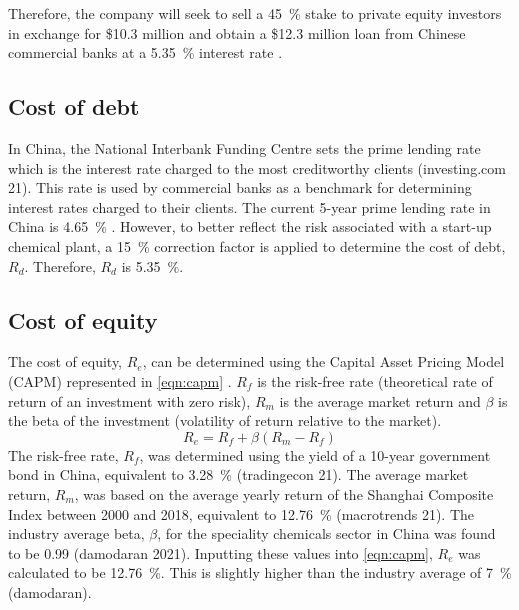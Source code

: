 Therefore, the company will seek to sell a \SI{45}{\percent} stake to private equity investors in exchange for \$10.3 million and obtain a \$12.3 million loan from Chinese commercial banks at a \SI{5.35}{\percent} interest rate \cite{rmb_industrial_21}.

\subsection{Cost of debt}
\label{sec:debt}
In China, the National Interbank Funding Centre sets the prime lending rate which is the interest rate charged to the most creditworthy clients (investing.com 21). This rate is used by commercial banks as a benchmark for determining interest rates charged to their clients. The current 5-year prime lending rate in China is \SI{4.65}{\percent} \cite{rmb_industrial_21}. However, to better reflect the risk associated with a start-up chemical plant, a \SI{15}{\percent} correction factor is applied to determine the cost of debt, $R_{d}$. Therefore, $R_{d}$ is \SI{5.35}{\percent}.

\subsection{Cost of equity}
\label{sec:equity}
The cost of equity, $R_{e}$, can be determined using the Capital Asset Pricing Model (CAPM) represented in \cref{eqn:capm} \cite{kenton_21}. $R_{f}$ is the risk-free rate (theoretical rate of return of an investment with zero risk), $R_{m}$ is the average market return and $\beta$ is the beta of the investment (volatility of return relative to the market).
\begin{equation}
\label{eqn:capm}
    R_{e}=R_{f}+\beta(R_{m}-R_{f})
\end{equation}
The risk-free rate, $R_{f}$, was determined using the yield of a 10-year government bond in China, equivalent to \SI{3.28}{\percent} (tradingecon 21). The average market return, $R_{m}$, was based on the average yearly return of the Shanghai Composite Index between 2000 and 2018, equivalent to \SI{12.76}{\percent} (macrotrends 21). The industry average beta, $\beta$, for the speciality chemicals sector in China was found to be 0.99 (damodaran 2021). Inputting these values into \cref{eqn:capm}, $R_{e}$ was calculated to be \SI{12.76}{\percent}. This is slightly higher than the industry average of \SI{7}{\percent} (damodaran).

